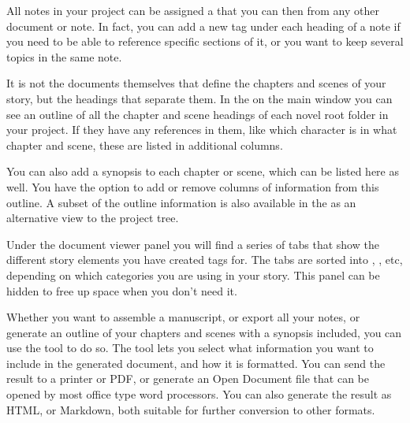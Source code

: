 \documentclass[a4paper,11pt,english]{sphinxmanual}
\begin{document}
\begin{description}
\sphinxAtStartPar
All notes in your project can be assigned a {\hyperref[\detokenize{int_glossary:term-Tag}]{}} that you can then {\hyperref[\detokenize{int_glossary:term-Reference}]{}} from
any other document or note. In fact, you can add a new tag under each heading of a note if you
need to be able to reference specific sections of it, or you want to keep several topics in the
same note.

\sphinxAtStartPar
It is not the documents themselves that define the chapters and scenes of your story, but the
headings that separate them. In the  on the main window you can see an outline
of all the chapter and scene headings of each novel root folder in your project. If they have
any references in them, like which character is in what chapter and scene, these are listed in
additional columns.

\sphinxAtStartPar
You can also add a synopsis to each chapter or scene, which can be listed here as well. You have
the option to add or remove columns of information from this outline. A subset of the outline
information is also available in the  as an alternative view to the project tree.

\sphinxAtStartPar
Under the document viewer panel you will find a series of tabs that show the different story
elements you have created tags for. The tabs are sorted into , , etc,
depending on which categories you are using in your story. This panel can be hidden to free up
space when you don’t need it.

\sphinxAtStartPar
Whether you want to assemble a manuscript, or export all your notes, or generate an outline of
your chapters and scenes with a synopsis included, you can use the  tool to
do so. The tool lets you select what information you want to include in the generated document,
and how it is formatted. You can send the result to a printer or PDF, or generate an Open
Document file that can be opened by most office type word processors. You can also generate the
result as HTML, or Markdown, both suitable for further conversion to other formats.

\end{description}
\end{document}
